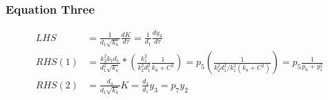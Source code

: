 \documentclass[10pt,letterpaper]{article}
\begin{document}
\subsubsection{Equation Three}
\begin{equation}
\begin{aligned}
LHS &= \frac{1}{d_1 \sqrt{k_4}} \frac{dK}{d\tau} = \frac{1}{d_1} \frac{dy_3}{d\tau} \\
RHS(1) &= \frac{k_2^2 k_7 d_1}{d_1^2 \sqrt{k_4}} * \left(  \frac{k_1^2}{k_2^2 d_1^2} \frac{1}{k_8 + C^2} \right)
  = p_5 \left( \frac{1}{ k_2^2 d_1^2 / k_1^2 (k_8+C^2)}\right) 
  = p_5 \frac{1}{ p_6 + y_1^2}  \\
RHS(2) &= \frac{d_3}{d_1 \sqrt{k_4}}K = \frac{d_3}{d_1} y_3 = p_7 y_2
\end{aligned}
\end{equation}
\end{document}
